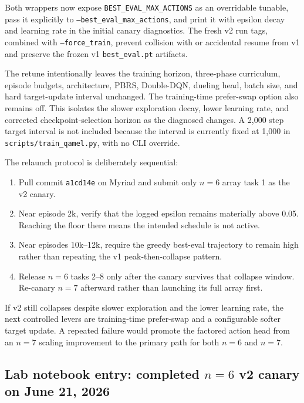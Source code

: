 \documentclass[11pt]{article}
\newcommand{\code}[1]{\texttt{#1}}
\newcommand{\file}[1]{\texttt{\small #1}}
\begin{document}
Both wrappers now expose \code{BEST\_EVAL\_MAX\_ACTIONS} as an overridable
tunable, pass it explicitly to
\code{--best\_eval\_max\_actions}, and print it with epsilon decay and learning
rate in the initial canary diagnostics. The fresh v2 run tags, combined with
\code{--force\_train}, prevent collision with or accidental resume from v1 and
preserve the frozen v1 \file{best\_eval.pt} artifacts.

The retune intentionally leaves the training horizon, three-phase curriculum,
episode budgets, architecture, PBRS, Double-DQN, dueling head, batch size, and
hard target-update interval unchanged. The training-time prefer-swap option also
remains off. This isolates the slower exploration decay, lower learning rate,
and corrected checkpoint-selection horizon as the diagnosed changes. A 2{,}000
step target interval is not included because the interval is currently fixed at
1{,}000 in \file{scripts/train\_qamel.py}, with no CLI override.

The relaunch protocol is deliberately sequential:

\begin{enumerate}
  \item Pull commit \code{a1cd14e} on Myriad and submit only $n=6$ array task 1
  as the v2 canary.
  \item Near episode 2k, verify that the logged epsilon remains materially above
  0.05. Reaching the floor there means the intended schedule is not active.
  \item Near episodes 10k--12k, require the greedy best-eval trajectory to remain
  high rather than repeating the v1 peak-then-collapse pattern.
  \item Release $n=6$ tasks 2--8 only after the canary survives that collapse
  window. Re-canary $n=7$ afterward rather than launching its full array first.
\end{enumerate}

If v2 still collapses despite slower exploration and the lower learning rate,
the next controlled levers are training-time prefer-swap and a configurable
softer target update. A repeated failure would promote the factored action head
from an $n=7$ scaling improvement to the primary path for both $n=6$ and $n=7$.

\subsection{Lab notebook entry: completed $n=6$ v2 canary on June 21, 2026}
\label{sec:lablog-2026-06-21-n6-v2}
\end{document}
